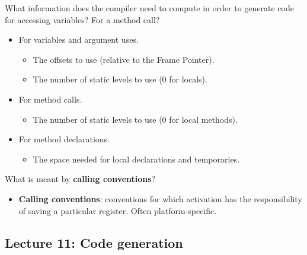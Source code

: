 \documentclass[11pt]{beamer}
\begin{document}
\begin{frame}
\begin{block}{What information does the compiler need to compute in order to generate code for accessing variables? For a method call? }

\begin{itemize}

\item For variables and argument uses.
\begin{itemize}
\item The offsets to use (relative to the Frame Pointer). 
\item The number of static levels to use (0 for locals).
\end{itemize}
\item For method calls.
\begin{itemize}
\item The number of static levels to use (0 for local methods).
\end{itemize}
\item For method declarations.
\begin{itemize}
\item The space needed for local declarations and temporaries.
\end{itemize}


\end{itemize}


\end{block}

\begin{block}{What is meant by \textbf{calling conventions}? }
\begin{itemize}
\item \textbf{Calling conventions}: conventions for which activation has the responsibility of saving a particular register. Often platform-specific.
\end{itemize}
\end{block}

\end{frame}

\subsection{Lecture 11: Code generation}
\end{document}
